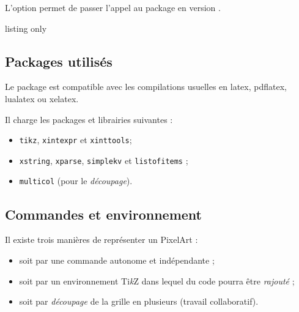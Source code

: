 \documentclass{article}
\newcommand\Cle[1]{{\bfseries\sffamily\textlangle #1\textrangle}}
\begin{document}
\smallskip

L'option \Cle{[csvii]} permet de passer l'appel au package en version .

\begin{PresentationCode}{listing only}
\usepackage{PixelArtTikz}                     %

\usepackage[csvii]{PixelArtTikz}              %
\end{PresentationCode}

\subsection{Packages utilisés}

Le package est compatible avec les compilations usuelles en \textsf{latex}, \textsf{pdflatex}, \textsf{lualatex} ou \textsf{xelatex}.

\medskip

Il charge les packages et librairies suivantes :

\begin{itemize}
	\item \texttt{tikz}, \texttt{xintexpr} et \texttt{xinttools};
	\item \texttt{xstring}, \texttt{xparse}, \texttt{simplekv} et \texttt{listofitems} ;
	\item \texttt{multicol} (pour le \textit{découpage}).
\end{itemize}

\pagebreak

\subsection{Commandes et environnement}

Il existe trois manières de représenter un PixelArt :

\begin{itemize}
	\item soit par une commande autonome et indépendante ;
	\item soit par un environnement Ti\textit{k}Z dans lequel du code pourra être \textit{rajouté} ;
	\item soit par \textit{découpage} de la grille en plusieurs (travail collaboratif).
\end{itemize}
\end{document}
